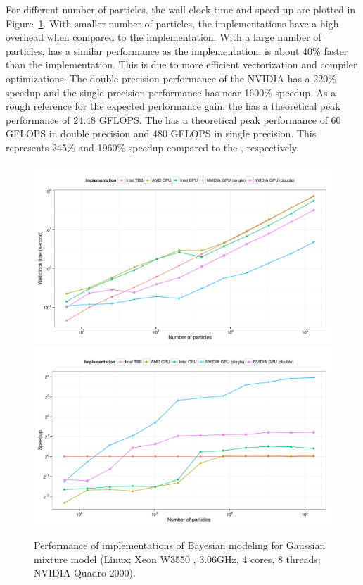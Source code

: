 For different number of particles, the wall clock time and speed up are
plotted in Figure~\ref{fig:bench-ocl-perf}. With smaller number of particles,
the \opencl implementations have a high overhead when compared to the \tbb
implementation. With a large number of particles, \aocl has a similar
performance as the \tbb implementation. \iocl is about 40\% faster than the
\tbb implementation. This is due to more efficient vectorization and compiler
optimizations. The double precision performance of the NVIDIA \gpu has a 220\%
speedup and the single precision performance has near 1600\% speedup. As a
rough reference for the expected performance gain, the \cpu has a theoretical
peak performance of 24.48 GFLOPS. The \gpu has a theoretical peak performance
of 60 GFLOPS in double precision and 480 GFLOPS in single precision. This
represents 245\% and 1960\% speedup compared to the \cpu, respectively.

\begin{figure}
  \centering
  \includegraphics[width=\linewidth]{fig/bench-ocl-time-running}
  \includegraphics[width=\linewidth]{fig/bench-ocl-speedup-running}
  \caption{Performance of \opencl implementations of Bayesian modeling for
    Gaussian mixture model (Linux; Xeon W3550 \gpu, 3.06GHz, 4 cores, 8
    threads; NVIDIA Quadro 2000).}
  \label{fig:bench-ocl-perf}
\end{figure}

